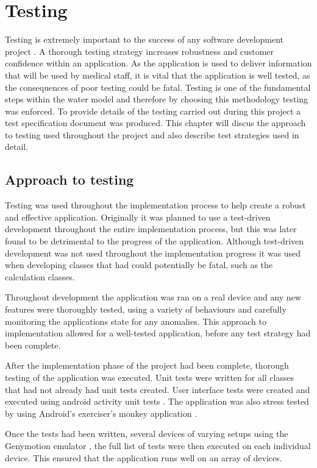 \chapter{Testing}
Testing is extremely important to the success of any software development project \cite{tdd}. A thorough testing strategy increases robustness and customer confidence within an application. As the application is used to deliver information that will be used by medical staff, it is vital that the application is well tested, as the consequences of poor testing could be fatal. Testing is one of the fundamental steps within the water model \cite{waterfall} and therefore by choosing this methodology testing was enforced. To provide details of the testing carried out during this project a test specification document was produced. This chapter will discus the approach to testing used throughout the project and also describe test strategies used in detail.

\section{Approach to testing}

Testing was used throughout the implementation process to help create a robust and effective application. Originally it was planned to use a test-driven development \cite{tdd} throughout the entire implementation process, but this was later found to be detrimental to the progress of the application.  Although test-driven development was not used throughout the implementation progress it was used when developing classes that had could potentially be fatal, such as the calculation classes. 

Throughout development the application was ran on a real device and any new features were thoroughly tested, using a variety of behaviours and carefully monitoring the applications state for any anomalies. This approach to implementation allowed for a well-tested application, before any test strategy had been complete.

After the implementation phase of the project had been complete, thorough testing of the application was executed. Unit tests \cite{junit} were written for all classes that had not already had unit tests created. User interface tests were created and executed using android activity unit tests \cite{activity_test}. The application was also stress tested by using Android’s exerciser’s monkey application \cite{exciser}.

Once the tests had been written, several devices of varying setups using the Genymotion emulator \cite{genymotion}, the full list of tests were then executed on each individual device. This ensured that the application runs well on an array of devices.


